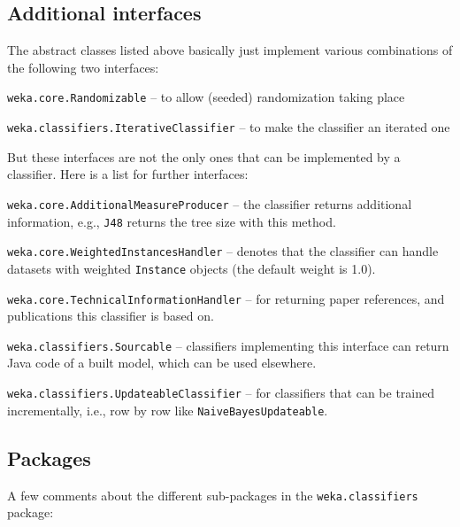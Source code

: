 \subsection{Additional interfaces}
The abstract classes listed above basically just implement various combinations
of the following two interfaces:
\begin{tight_itemize}
  \item \texttt{weka.core.Randomizable} -- to allow (seeded) randomization
taking place
  \item \texttt{weka.classifiers.IterativeClassifier} -- to make the classifier
an iterated one
\end{tight_itemize}
But these interfaces are not the only ones that can be implemented by
a classifier. Here is a list for further interfaces:
\begin{tight_itemize}
  \item \texttt{weka.core.AdditionalMeasureProducer} -- the classifier returns
additional information, e.g., \texttt{J48} returns the tree size with this
method.
  \item \texttt{weka.core.WeightedInstancesHandler} -- denotes that the
classifier can handle datasets with weighted \texttt{Instance} objects (the
default weight is 1.0).
  \item \texttt{weka.core.TechnicalInformationHandler} -- for returning paper
references, and publications this classifier is based on.
  \item \texttt{weka.classifiers.Sourcable} -- classifiers implementing this
interface can return Java code of a built model, which can be used elsewhere.
  \item \texttt{weka.classifiers.UpdateableClassifier} -- for classifiers that
can be trained incrementally, i.e., row by row like
\texttt{NaiveBayesUpdateable}.
\end{tight_itemize}

\pagebreak
\subsection{Packages}
A few comments about the different sub-packages in the \texttt{weka.classifiers}
package:

